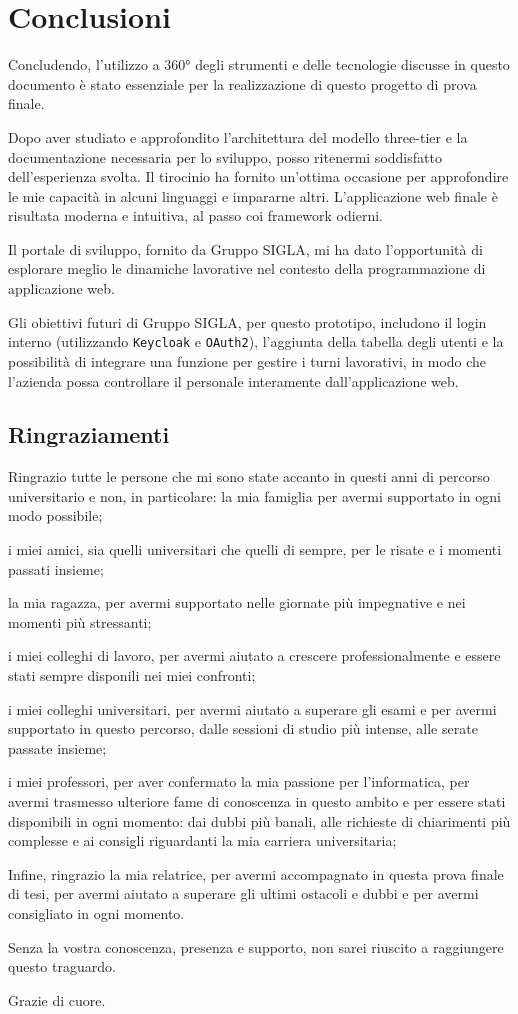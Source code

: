 \chapter{Conclusioni}\label{ch:conclusioni}
Concludendo, l'utilizzo a 360° degli strumenti e delle tecnologie discusse in questo documento è stato essenziale per la realizzazione di questo progetto di prova finale. 

Dopo aver studiato e approfondito l'architettura del modello three-tier e la documentazione necessaria per lo sviluppo, posso ritenermi soddisfatto dell'esperienza svolta.
Il tirocinio ha fornito un'ottima occasione per approfondire le mie capacità in alcuni linguaggi e impararne altri.
L'applicazione web finale è risultata moderna e intuitiva, al passo coi \gls{framework} odierni. 

Il portale di sviluppo, fornito da Gruppo SIGLA, mi ha dato l'opportunità di esplorare meglio le dinamiche lavorative nel contesto della programmazione di applicazione web.

Gli obiettivi futuri di Gruppo SIGLA, per questo prototipo, includono il login interno (utilizzando \texttt{Keycloak}\cite{keycloak} e \texttt{OAuth2}\cite{oauth2}), l'aggiunta della tabella degli utenti e la possibilità di integrare una funzione per gestire i turni lavorativi, in modo che l'azienda possa controllare il personale interamente dall'applicazione web.

\section{Ringraziamenti}\label{sec:ringraziamenti}
Ringrazio tutte le persone che mi sono state accanto in questi anni di percorso universitario e non, in particolare: la mia famiglia per avermi supportato in ogni modo possibile;

i miei amici, sia quelli universitari che quelli di sempre, per le risate e i momenti passati insieme;

la mia ragazza, per avermi supportato nelle giornate più impegnative e nei momenti più stressanti;

i miei colleghi di lavoro, per avermi aiutato a crescere professionalmente e essere stati sempre disponili nei miei confronti;

i miei colleghi universitari, per avermi aiutato a superare gli esami e per avermi supportato in questo percorso, dalle sessioni di studio più intense, alle serate passate insieme;

i miei professori, per aver confermato la mia passione per l'informatica, per avermi trasmesso ulteriore fame di conoscenza in questo ambito e per essere stati disponibili in ogni momento: dai dubbi più banali, alle richieste di chiarimenti più complesse e ai consigli riguardanti la mia carriera universitaria;

Infine, ringrazio la mia relatrice, per avermi accompagnato in questa prova finale di tesi, per avermi aiutato a superare gli ultimi ostacoli e dubbi e per avermi consigliato in ogni momento. 

Senza la vostra conoscenza, presenza e supporto, non sarei riuscito a raggiungere questo traguardo. 

Grazie di cuore.
